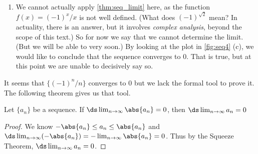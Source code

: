 \begin{example}
\begin{enumerate}
\item		We cannot actually apply \autoref{thm:seq_limit} here, as the function $f(x) = (-1)^x/x$ is not well defined. (What does $(-1)^{\sqrt{2}}$ mean? In actuality, there is an answer, but it involves \emph{complex analysis}, beyond the scope of this text.) So for now we say that we cannot determine the limit. (But we will be able to very soon.) By looking at the plot in \autoref{fig:seq4} (c), we would like to conclude that the sequence converges to 0. That is true, but at this point we are unable to decisively say so.
\end{enumerate}
\end{example}

It seems that  %
$\{(-1)^n/n\}$ converges to 0 but we lack the formal tool to prove it. The following theorem gives us that tool.

\begin{theorem}\label{thm:abs_val_seq}%
Let $\{a_n\}$ be a sequence. If $\ds \lim_{n\to\infty}\abs{a_n}= 0$, then $\ds \lim_{n\to\infty} a_n = 0$
\end{theorem}

\begin{proof}
We know $-\abs{a_n}\leq a_n\leq\abs{a_n}$ and $\ds \lim_{n\to \infty} (-\abs{a_n})=-\lim_{n\to\infty}\abs{a_n}=0$. Thus by the Squeeze Theorem, $\ds \lim_{n\to\infty} a_n =0$.
\end{proof}

